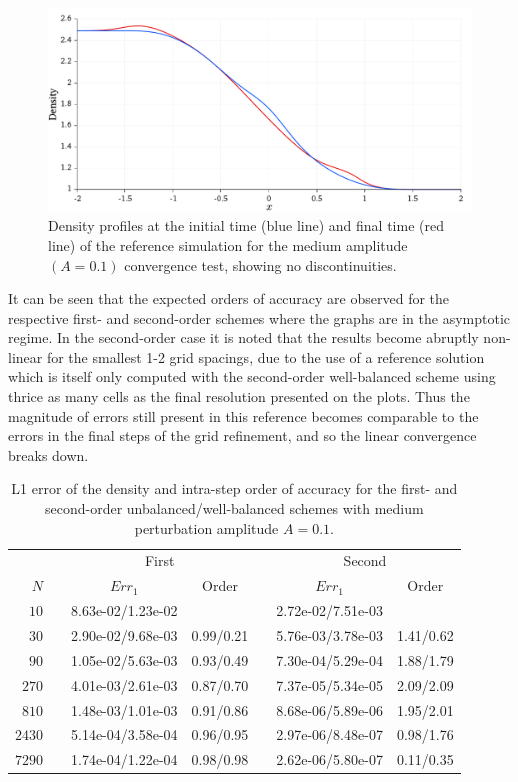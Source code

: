 \begin {figure}
\centering
\includegraphics[width=13cm]{figures/OVSeps0_1profile}
\caption {Density profiles at the initial time (blue line) and final time (red line) of the reference simulation for the medium amplitude $(A=0.1)$ convergence test, showing no discontinuities.}
\label{fig:OVS_Amedium_profile}
\end{figure}

It can be seen that the expected orders of accuracy are observed for the respective first- and second-order schemes where the graphs are in the asymptotic regime. In the second-order case it is noted that the results become abruptly non-linear for the smallest 1-2 grid spacings, due to the use of a reference solution which is itself only computed with the second-order well-balanced scheme using thrice as many cells as the final resolution presented on the plots. Thus the magnitude of errors still present in this reference becomes comparable to the errors in the final steps of the grid refinement, and so the linear convergence breaks down.

\begin{table}\centering
\caption{L1 error of the density and intra-step order of accuracy for the first- and second-order unbalanced/well-balanced schemes with medium perturbation amplitude $A=0.1$.}
\label{table:OVS_Amedium}
\begin{tabular}{@{}rcccccc@{}}\toprule
& \phantom{a} & \multicolumn{2}{c}{First} & \phantom{ab} & \multicolumn{2}{c}{Second}\\
\cmidrule{3-4} \cmidrule{6-7}
$N$ && $Err_1$ & Order && $Err_1$ & Order\\ \midrule
$10$ && 8.63e-02/1.23e-02 &&& 2.72e-02/7.51e-03 &\\
$30$ && 2.90e-02/9.68e-03 & 0.99/0.21 && 5.76e-03/3.78e-03 & 1.41/0.62\\
$90$ && 1.05e-02/5.63e-03 & 0.93/0.49 && 7.30e-04/5.29e-04 & 1.88/1.79\\
$270$ && 4.01e-03/2.61e-03 & 0.87/0.70 && 7.37e-05/5.34e-05 & 2.09/2.09\\
$810$ && 1.48e-03/1.01e-03 & 0.91/0.86 && 8.68e-06/5.89e-06 & 1.95/2.01\\
$2430$ && 5.14e-04/3.58e-04 & 0.96/0.95 && 2.97e-06/8.48e-07 & 0.98/1.76\\
$7290$ && 1.74e-04/1.22e-04 & 0.98/0.98 && 2.62e-06/5.80e-07 & 0.11/0.35\\
\bottomrule
\end{tabular}
\end{table}


